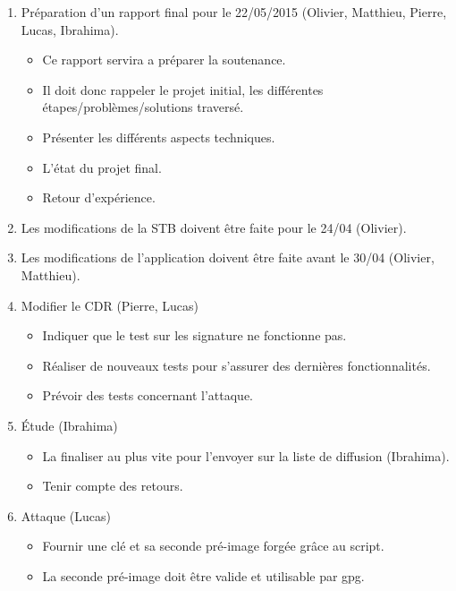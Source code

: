 \documentclass{CR-projet}
\begin{document}
\begin{enumerate}
	\item Préparation d'un rapport final pour le 22/05/2015 (Olivier, Matthieu, Pierre, Lucas, Ibrahima).
	\begin{itemize}
		\item Ce rapport servira a préparer la soutenance.
		\item Il doit donc rappeler le projet initial, les différentes étapes/problèmes/solutions traversé.
		\item Présenter les différents aspects techniques.
		\item L'état du projet final.
		\item Retour d'expérience.
	\end{itemize}
	\item Les modifications de la STB doivent être faite pour le 24/04 (Olivier).
	\item Les modifications de l'application doivent être faite avant le 30/04 (Olivier, Matthieu).
	\item Modifier le CDR (Pierre, Lucas)
	\begin{itemize}
		\item Indiquer que le test sur les signature ne fonctionne pas.
		\item Réaliser de nouveaux tests pour s'assurer des dernières fonctionnalités.
		\item Prévoir des tests concernant l'attaque.
	\end{itemize}
	\item Étude (Ibrahima)
	\begin{itemize}
		\item La finaliser au plus vite pour l'envoyer sur la liste de diffusion (Ibrahima).
		\item Tenir compte des retours.
	\end{itemize}
	\item Attaque (Lucas)
	\begin{itemize}
		\item Fournir une clé et sa seconde pré-image forgée grâce au script.
		\item La seconde pré-image doit être valide et utilisable par gpg.
	\end{itemize}
\end{enumerate}
\end{document}
